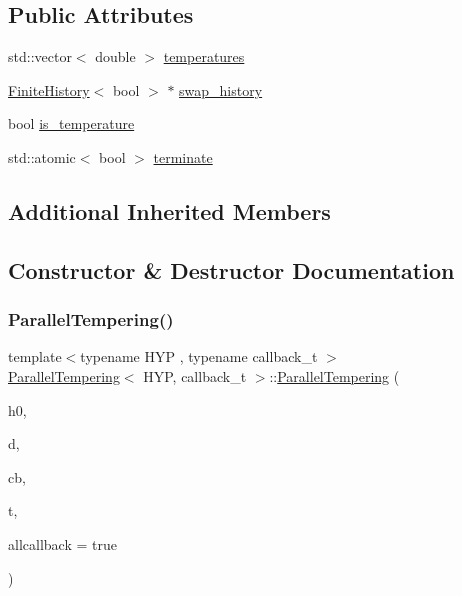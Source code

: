 \subsection*{Public Attributes}
\begin{DoxyCompactItemize}
\item 
std\+::vector$<$ double $>$ \hyperlink{class_parallel_tempering_a5aca1e6ca522986f183d61c91c94d21d}{temperatures}
\item 
\hyperlink{class_finite_history}{Finite\+History}$<$ bool $>$ $\ast$ \hyperlink{class_parallel_tempering_af9ae9446ae4d22c0a26755f3d3a1d86a}{swap\+\_\+history}
\item 
bool \hyperlink{class_parallel_tempering_ae9f0a2af938df838cc4010983860394e}{is\+\_\+temperature}
\item 
std\+::atomic$<$ bool $>$ \hyperlink{class_parallel_tempering_acda523b375468743e7d8ac471af65285}{terminate}
\end{DoxyCompactItemize}
\subsection*{Additional Inherited Members}


\subsection{Constructor \& Destructor Documentation}
\mbox{\label{class_parallel_tempering_aec98f6abe3a51a3cf79b508ba176d290}} 
\subsubsection{\texorpdfstring{Parallel\+Tempering()}{ParallelTempering()}\hspace{0.1cm}{\footnotesize\ttfamily [1/3]}}
{\footnotesize\ttfamily template$<$typename H\+YP , typename callback\+\_\+t $>$ \\
\hyperlink{class_parallel_tempering}{Parallel\+Tempering}$<$ H\+YP, callback\+\_\+t $>$\+::\hyperlink{class_parallel_tempering}{Parallel\+Tempering} (\begin{DoxyParamCaption}\item[{H\+YP \&}]{h0,  }\item[{typename H\+Y\+P\+::data\+\_\+t $\ast$}]{d,  }\item[{callback\+\_\+t \&}]{cb,  }\item[{std\+::initializer\+\_\+list$<$ double $>$}]{t,  }\item[{bool}]{allcallback = {\ttfamily true} }\end{DoxyParamCaption})\hspace{0.3cm}{\ttfamily [inline]}}

